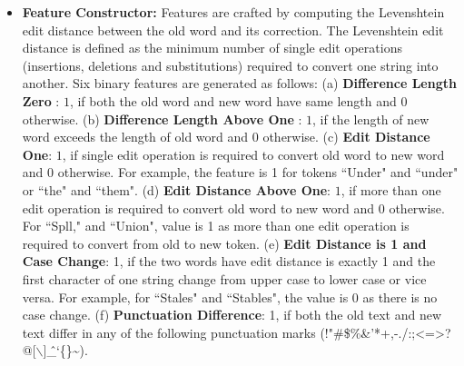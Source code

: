 \documentclass[10pt, conference, compsocconf]{IEEEtran}
\begin{document}
\begin{enumerate}
\begin{itemize}
\item \textbf{Feature Constructor: } Features are crafted by computing the Levenshtein edit distance between the old word and its correction. The Levenshtein edit distance \cite{Wagner_74} is defined as the minimum number of single edit operations (insertions, deletions and substitutions) required to convert one string into another. Six binary features are generated as follows: 
(a) \textbf{Difference Length Zero} : $1$, if both the old word and new word have same length and $0$ otherwise. 
(b) \textbf{Difference Length Above One} : $1$, if the length of new word exceeds the length of old word and $0$ otherwise.
(c) \textbf{Edit Distance One}:  $1$, if single edit operation is required to convert old word to new word and $0$ otherwise. For example, the feature is 1 for tokens ``Under" and ``under" or ``the" and ``them".
(d) \textbf{Edit Distance Above One}: $1$, if more than one edit operation is required to convert old word to new word and $0$ otherwise. For ``Spll," and ``Union", value is 1 as more than one edit operation is required to convert from old to new token.
(e) \textbf{Edit Distance is 1 and Case Change}: 1, if the two words have edit distance is exactly 1 and the first character of one string change from upper case to lower case or vice versa. For example, for ``Stales" and ``Stables", the value is 0 as there is no case change.
(f) \textbf{Punctuation Difference}: 1, if both the old text and new text differ in any of the following punctuation marks (!"\#\$\%\&'*+,-./:;\textless=\textgreater?@[$\backslash$]\^\_`\{\textbar\}\textasciitilde).




\end{itemize}
\end{enumerate}
\end{document}
